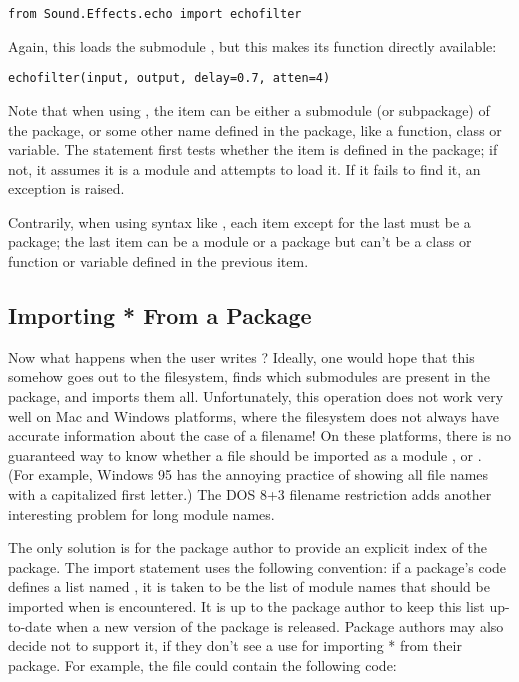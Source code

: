 \documentclass{manual}
\begin{document}
\begin{verbatim}
from Sound.Effects.echo import echofilter
\end{verbatim}

Again, this loads the submodule , but this makes its function
 directly available:

\begin{verbatim}
echofilter(input, output, delay=0.7, atten=4)
\end{verbatim}

Note that when using , the
item can be either a submodule (or subpackage) of the package, or some 
other name defined in the package, like a function, class or
variable.  The  statement first tests whether the item is
defined in the package; if not, it assumes it is a module and attempts
to load it.  If it fails to find it, an
 exception is raised.

Contrarily, when using syntax like , each item except for the last must be
a package; the last item can be a module or a package but can't be a
class or function or variable defined in the previous item.

\subsection{Importing * From a Package \label{pkg-import-star}}

Now what happens when the user writes ?  Ideally, one would hope that this somehow goes out to the
filesystem, finds which submodules are present in the package, and
imports them all.  Unfortunately, this operation does not work very
well on Mac and Windows platforms, where the filesystem does not
always have accurate information about the case of a filename!  On
these platforms, there is no guaranteed way to know whether a file
 should be imported as a module ,
 or .  (For example, Windows 95 has the
annoying practice of showing all file names with a capitalized first
letter.)  The DOS 8+3 filename restriction adds another interesting
problem for long module names.

The only solution is for the package author to provide an explicit
index of the package.  The import statement uses the following
convention: if a package's  code defines a list
named , it is taken to be the list of module names that
should be imported when  is
encountered.  It is up to the package author to keep this list
up-to-date when a new version of the package is released.  Package
authors may also decide not to support it, if they don't see a use for
importing * from their package.  For example, the file
 could contain the following code:
\end{document}
